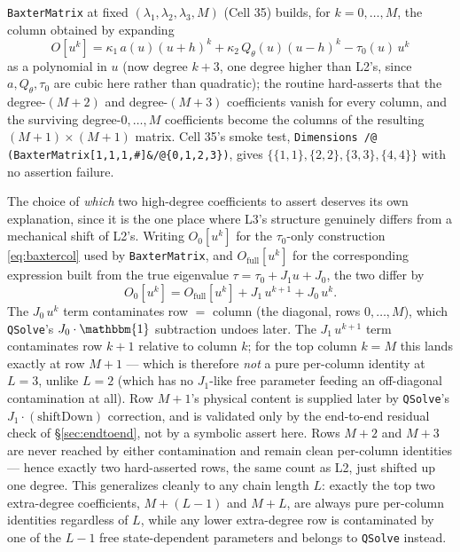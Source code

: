 \documentclass[11pt]{article}
\newcommand{\qth}{Q_\theta}
\begin{document}
\texttt{BaxterMatrix} at fixed $(\lambda_1,\lambda_2,\lambda_3,M)$ (Cell 35) builds, for
$k=0,\dots,M$, the column obtained by expanding
\begin{equation}
  O[u^k] = \kappa_1\,a(u)(u+h)^k + \kappa_2\,\qth(u)(u-h)^k - \tau_0(u)\,u^k
  \label{eq:baxtercol}
\end{equation}
as a polynomial in $u$ (now degree $k+3$, one degree higher than L2's, since $a,\qth,\tau_0$ are
cubic here rather than quadratic); the routine hard-asserts that the degree-$(M{+}2)$ and
degree-$(M{+}3)$ coefficients vanish for every column, and the surviving degree-$0,\dots,M$
coefficients become the columns of the resulting $(M{+}1)\times(M{+}1)$ matrix. Cell 35's smoke test,
\texttt{Dimensions /@ (BaxterMatrix[1,1,1,\#]\&/@\{0,1,2,3\})}, gives $\{\{1,1\},\{2,2\},\{3,3\},\{4,4\}\}$
with no assertion failure.

The choice of \emph{which} two high-degree coefficients to assert deserves its own explanation, since
it is the one place where L3's structure genuinely differs from a mechanical shift of L2's. Writing
$O_0[u^k]$ for the $\tau_0$-only construction \eqref{eq:baxtercol} used by \texttt{BaxterMatrix}, and
$O_{\mathrm{full}}[u^k]$ for the corresponding expression built from the true eigenvalue
$\tau=\tau_0+J_1u+J_0$, the two differ by
\[
  O_0[u^k] = O_{\mathrm{full}}[u^k] + J_1\,u^{k+1} + J_0\,u^k.
\]
The $J_0\,u^k$ term contaminates row $=$ column (the diagonal, rows $0,\dots,M$), which
\texttt{QSolve}'s $J_0\cdot\mathbbm{1}$ subtraction undoes later. The $J_1\,u^{k+1}$ term contaminates
row $k{+}1$ relative to column $k$; for the top column $k=M$ this lands exactly at row $M{+}1$ ---
which is therefore \emph{not} a pure per-column identity at $L=3$, unlike $L=2$ (which has no
$J_1$-like free parameter feeding an off-diagonal contamination at all). Row $M{+}1$'s physical
content is supplied later by \texttt{QSolve}'s $J_1\cdot(\text{shiftDown})$ correction, and is
validated only by the end-to-end residual check of \S\ref{sec:endtoend}, not by a symbolic assert
here. Rows $M{+}2$ and $M{+}3$ are never reached by either contamination and remain clean per-column
identities --- hence exactly two hard-asserted rows, the same count as L2, just shifted up one degree.
This generalizes cleanly to any chain length $L$: exactly the top two extra-degree coefficients,
$M{+}(L{-}1)$ and $M{+}L$, are always pure per-column identities regardless of $L$, while any lower
extra-degree row is contaminated by one of the $L{-}1$ free state-dependent parameters and belongs to
\texttt{QSolve} instead.
\end{document}
